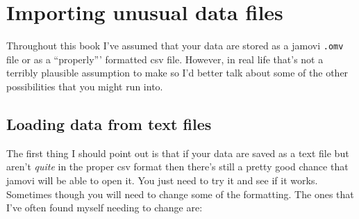 \documentclass[
]{book}
\begin{document}
\hypertarget{importing}{%
\section{Importing unusual data files}\label{importing}}

Throughout this book I've assumed that your data are stored as a jamovi \texttt{.omv} file or as a ``properly''' formatted csv file. However, in real life that's not a terribly plausible assumption to make so I'd better talk about some of the other possibilities that you might run into.

\hypertarget{loading-data-from-text-files}{%
\subsection{Loading data from text files}\label{loading-data-from-text-files}}

The first thing I should point out is that if your data are saved as a text file but aren't \emph{quite} in the proper csv format then there's still a pretty good chance that jamovi will be able to open it. You just need to try it and see if it works. Sometimes though you will need to change some of the formatting. The ones that I've often found myself needing to change are:
\end{document}
